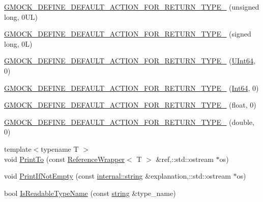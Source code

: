 \begin{DoxyCompactItemize}
\item 
\hyperlink{namespacetesting_1_1internal_a1f4167b954a7ff0074ce8a5bb855f86f}{G\+M\+O\+C\+K\+\_\+\+D\+E\+F\+I\+N\+E\+\_\+\+D\+E\+F\+A\+U\+L\+T\+\_\+\+A\+C\+T\+I\+O\+N\+\_\+\+F\+O\+R\+\_\+\+R\+E\+T\+U\+R\+N\+\_\+\+T\+Y\+P\+E\+\_\+} (unsigned long, 0\+U\+L)
\item 
\hyperlink{namespacetesting_1_1internal_ad8804e25537427755c324ab03a72e776}{G\+M\+O\+C\+K\+\_\+\+D\+E\+F\+I\+N\+E\+\_\+\+D\+E\+F\+A\+U\+L\+T\+\_\+\+A\+C\+T\+I\+O\+N\+\_\+\+F\+O\+R\+\_\+\+R\+E\+T\+U\+R\+N\+\_\+\+T\+Y\+P\+E\+\_\+} (signed long, 0\+L)
\item 
\hyperlink{namespacetesting_1_1internal_ad2efcdbd12c7c020745b87bcc0997809}{G\+M\+O\+C\+K\+\_\+\+D\+E\+F\+I\+N\+E\+\_\+\+D\+E\+F\+A\+U\+L\+T\+\_\+\+A\+C\+T\+I\+O\+N\+\_\+\+F\+O\+R\+\_\+\+R\+E\+T\+U\+R\+N\+\_\+\+T\+Y\+P\+E\+\_\+} (\hyperlink{namespacetesting_1_1internal_aa6a1ac454e6d7e550fa4925c62c35caa}{U\+Int64}, 0)
\item 
\hyperlink{namespacetesting_1_1internal_ab427739121a380a7934bda96153f053d}{G\+M\+O\+C\+K\+\_\+\+D\+E\+F\+I\+N\+E\+\_\+\+D\+E\+F\+A\+U\+L\+T\+\_\+\+A\+C\+T\+I\+O\+N\+\_\+\+F\+O\+R\+\_\+\+R\+E\+T\+U\+R\+N\+\_\+\+T\+Y\+P\+E\+\_\+} (\hyperlink{namespacetesting_1_1internal_a271c563fec38b804ddab0677f51f70a8}{Int64}, 0)
\item 
\hyperlink{namespacetesting_1_1internal_a71c697e5b567365fd3ff6c720769633b}{G\+M\+O\+C\+K\+\_\+\+D\+E\+F\+I\+N\+E\+\_\+\+D\+E\+F\+A\+U\+L\+T\+\_\+\+A\+C\+T\+I\+O\+N\+\_\+\+F\+O\+R\+\_\+\+R\+E\+T\+U\+R\+N\+\_\+\+T\+Y\+P\+E\+\_\+} (float, 0)
\item 
\hyperlink{namespacetesting_1_1internal_a7ba92aa33f4968c902623cd02e445020}{G\+M\+O\+C\+K\+\_\+\+D\+E\+F\+I\+N\+E\+\_\+\+D\+E\+F\+A\+U\+L\+T\+\_\+\+A\+C\+T\+I\+O\+N\+\_\+\+F\+O\+R\+\_\+\+R\+E\+T\+U\+R\+N\+\_\+\+T\+Y\+P\+E\+\_\+} (double, 0)
\item 
{\footnotesize template$<$typename T $>$ }\\void \hyperlink{namespacetesting_1_1internal_a880d891d434f918b29a382f90e47cecb}{Print\+To} (const \hyperlink{classtesting_1_1internal_1_1ReferenceWrapper}{Reference\+Wrapper}$<$ T $>$ \&ref,\+::std\+::ostream $\ast$os)
\item 
void \hyperlink{namespacetesting_1_1internal_a77c9e2b66d2b2414db4763971180d53c}{Print\+If\+Not\+Empty} (const \hyperlink{namespacetesting_1_1internal_a8e8ff5b11e64078831112677156cb111}{internal\+::string} \&explanation,\+::std\+::ostream $\ast$os)
\item 
bool \hyperlink{namespacetesting_1_1internal_a19a5d50382569ce6ee94e2b68ddc6fc7}{Is\+Readable\+Type\+Name} (const \hyperlink{namespacetesting_1_1internal_a8e8ff5b11e64078831112677156cb111}{string} \&type\+\_\+name)

\end{DoxyCompactItemize}
